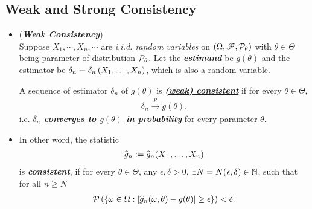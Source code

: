 \documentclass[11pt]{article}
\begin{document}
\subsection{Weak and Strong Consistency}
\begin{itemize}
\item \begin{definition} (\emph{\textbf{Weak Consistency}}) \citep{lehmann1998theory, resnick2013probability} \\
Suppose $X_{1},\cdots, X_{n}, \cdots$ are \emph{i.i.d. random variables} on $(\Omega, {\mathscr F}, {\mathcal P}_{\theta})$ with $\theta\in \Theta$ being parameter of distribution ${\mathcal P}_{\theta}$. Let the \emph{\textbf{estimand}} be $g(\theta)$  and the estimator be $\delta_{n}\equiv  \delta_{n}\left(X_{1},\ldots, X_{n}\right)$, which is also a random variable. 

A sequence of estimator $\delta_{n}$ of $g(\theta)$ is \underline{\emph{\textbf{(weak) consistent}}} if for every $\theta \in \Theta$, 
\begin{align*}
\delta_{n} \stackrel{p}{\rightarrow} g(\theta).
\end{align*} i.e. \underline{\emph{\textbf{$\delta_{n}$ converges to $g(\theta)$ in probability}}} for every parameter $\theta$.
\end{definition}

\item \begin{remark}
In other word, the statistic
\begin{align*}
\widehat{g}_{n} := \widehat{g}_{n}(X_1 \,{,}\ldots{,}\, X_n)
\end{align*} is \emph{\textbf{consistent}}, if for every $\theta \in \Theta$, any $\epsilon, \delta >0$, $\exists N = N(\epsilon, \delta) \in {\mathbb N}$, such that for all $n \ge N$
\begin{align*}
{\mathcal P}\left(\left\{\omega \in \Omega: \left\lvert \widehat{g}_{n}(\omega, \theta) - g(\theta) \right\rvert \ge \epsilon\right\} \right) < \delta.
\end{align*}
\end{remark}


\end{itemize}
\end{document}

